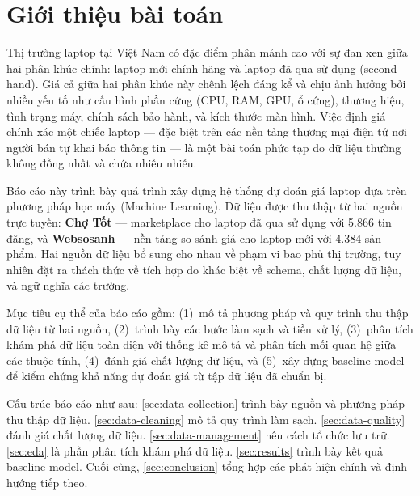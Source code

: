 \section{Giới thiệu bài toán}
\label{sec:introduction}

Thị trường laptop tại Việt Nam có đặc điểm phân mảnh cao với sự đan xen giữa hai phân khúc chính: laptop mới chính hãng và laptop đã qua sử dụng (second-hand). Giá cả giữa hai phân khúc này chênh lệch đáng kể và chịu ảnh hưởng bởi nhiều yếu tố như cấu hình phần cứng (CPU, RAM, GPU, ổ cứng), thương hiệu, tình trạng máy, chính sách bảo hành, và kích thước màn hình. Việc định giá chính xác một chiếc laptop --- đặc biệt trên các nền tảng thương mại điện tử nơi người bán tự khai báo thông tin --- là một bài toán phức tạp do dữ liệu thường không đồng nhất và chứa nhiều nhiễu.

Báo cáo này trình bày quá trình xây dựng hệ thống dự đoán giá laptop dựa trên phương pháp học máy (Machine Learning). Dữ liệu được thu thập từ hai nguồn trực tuyến: \textbf{Chợ Tốt} --- marketplace cho laptop đã qua sử dụng với 5.866 tin đăng, và \textbf{Websosanh} --- nền tảng so sánh giá cho laptop mới với 4.384 sản phẩm. Hai nguồn dữ liệu bổ sung cho nhau về phạm vi bao phủ thị trường, tuy nhiên đặt ra thách thức về tích hợp do khác biệt về schema, chất lượng dữ liệu, và ngữ nghĩa các trường.

Mục tiêu cụ thể của báo cáo gồm: (1)~mô tả phương pháp và quy trình thu thập dữ liệu từ hai nguồn, (2)~trình bày các bước làm sạch và tiền xử lý, (3)~phân tích khám phá dữ liệu toàn diện với thống kê mô tả và phân tích mối quan hệ giữa các thuộc tính, (4)~đánh giá chất lượng dữ liệu, và (5)~xây dựng baseline model để kiểm chứng khả năng dự đoán giá từ tập dữ liệu đã chuẩn bị.

Cấu trúc báo cáo như sau: \cref{sec:data-collection} trình bày nguồn và phương pháp thu thập dữ liệu. \cref{sec:data-cleaning} mô tả quy trình làm sạch. \cref{sec:data-quality} đánh giá chất lượng dữ liệu. \cref{sec:data-management} nêu cách tổ chức lưu trữ. \cref{sec:eda} là phần phân tích khám phá dữ liệu. \cref{sec:results} trình bày kết quả baseline model. Cuối cùng, \cref{sec:conclusion} tổng hợp các phát hiện chính và định hướng tiếp theo.
